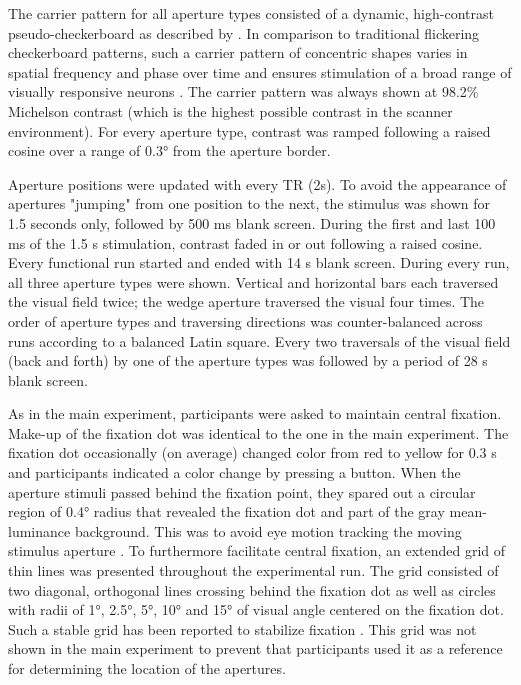 The carrier pattern for all aperture types consisted of a dynamic, high-contrast pseudo-checkerboard as described by \parencite{Schwarzkopf2014}. In comparison to traditional flickering checkerboard patterns, such a carrier pattern of concentric shapes varies in spatial frequency and phase over time and ensures stimulation of a broad range of visually responsive neurons \parencite{Alvarez2015}. The carrier pattern was always shown at 98.2\% Michelson contrast (which is the highest possible contrast in the scanner environment). For every aperture type, contrast was ramped following a raised cosine over a range of 0.3° from the aperture border.

Aperture positions were updated with every TR (2s). To avoid the appearance of apertures "jumping" from one position to the next, the stimulus was shown for 1.5 seconds only, followed by 500 ms blank screen. During the first and last 100 ms of the 1.5 s stimulation, contrast faded in or out following a raised cosine. Every functional run started and ended with 14 s blank screen. During every run, all three aperture types were shown. Vertical and horizontal bars each traversed the visual field twice; the wedge aperture traversed the visual four times. The order of aperture types and traversing directions was counter-balanced across runs according to a balanced Latin square. Every two traversals of the visual field (back and forth) by one of the aperture types was followed by a period of 28 s blank screen.

As in the main experiment, participants were asked to maintain central fixation. Make-up of the fixation dot was identical to the one in the main experiment. The fixation dot occasionally (on average) changed color from red to yellow for 0.3 s and participants indicated a color change by pressing a button. When the aperture stimuli passed behind the fixation point, they spared out a circular region of 0.4° radius that revealed the fixation dot and part of the gray mean-luminance background. This was to avoid eye motion tracking the moving stimulus aperture \parencite{Harvey2016}. To furthermore facilitate central fixation, an extended grid of thin lines was presented throughout the experimental run. The grid consisted of two diagonal, orthogonal lines crossing behind the fixation dot as well as circles with radii of 1°, 2.5°, 5°, 10° and 15° of visual angle centered on the fixation dot. Such a stable grid has been reported to stabilize fixation \parencite{Tyler2005}. This grid was not shown in the main experiment to prevent that participants used it as a reference for determining the location of the apertures.

